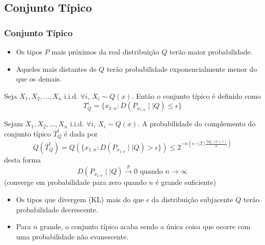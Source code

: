 \subsection{Conjunto Típico}
\begin{frame}[allowframebreaks]
  \frametitle{Conjunto Típico}
  \begin{itemize}
  \item Os tipos $P$ mais próximos da real distribuição $Q$ terão maior probabilidade.
  \item Aqueles mais distantes de $Q$ terão probabilidade exponencialmente menor do que os demais.
  \end{itemize}

   \begin{definition}
   Seja $X_1, X_2, \ldots, X_n$ i.i.d. $\forall i$, $X_i \sim Q(x)$. Então o conjunto típico é definido como
        \begin{equation}
        T^{\epsilon}_{Q} = \{ x_{1:n} : D(P_{x_{1:n}} \mid \mid Q) \leq \epsilon \}
        \end{equation}
   \end{definition}

   \framebreak

  \begin{theorem}
  Sejam $X_1, X_2, \ldots, X_n$ i.i.d. $\forall i$, $X_i \sim Q(x)$. A probabilidade do complemento
  do conjunto típico $\overline{T}^{\epsilon}_Q$ é dada por
	\begin{equation}
	Q(\overline{T}^{\epsilon}_Q) = Q( \{ x_{1:n} : D(P_{x_{1:n}} \mid\mid Q) > \epsilon  \} ) \leq 2^{-n (\epsilon - \vert \mathcal{X} \vert \frac{\log (n+1)}{n})}
	\end{equation}
  desta forma
	\begin{equation}
	D(P_{x_{1:n}} \mid\mid Q) \xrightarrow{p} 0 \text{ quando } n \rightarrow \infty
	\end{equation}
  (converge em probabilidade para zero quando $n$ é grande suficiente)
  \end{theorem}
  \begin{itemize}
  \item Os tipos que divergem (KL) mais do que $\epsilon$ da distribuição subjacente $Q$ terão probabilidade decrescente. 
  \item Para $n$ grande, o conjunto típico acaba sendo a única coisa que ocorre com uma probabilidade não evanescente.
  \end{itemize} 


\end{frame}
